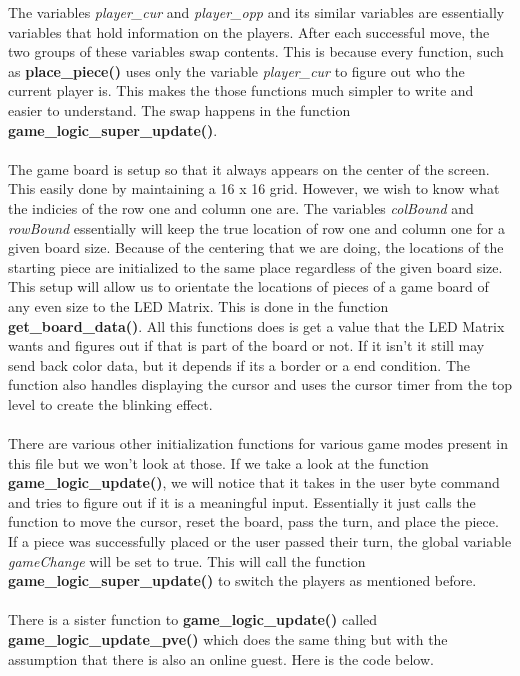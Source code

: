 \documentclass[a4paper, 12pt]{article}
\begin{document}
    The variables \textit{player\_cur} and \textit{player\_opp} and its similar
    variables are essentially variables that hold information on the players.
    After each successful move, the two groups of these variables swap contents.
    This is because every function, such as \textbf{place\_piece()} uses only
    the variable \textit{player\_cur} to figure out who the current player is.
    This makes the those functions much simpler to write and easier to understand.
    The swap happens in the function \textbf{game\_logic\_super\_update()}.
    \\ \\
    The game board is setup so that it always appears on the center of the screen.
    This easily done by maintaining a 16 x 16 grid. However, we wish to know
    what the indicies of the row one and column one are. The variables
    \textit{colBound} and \textit{rowBound} essentially will keep the true
    location of row one and column one for a given board size. Because of the
    centering that we are doing, the locations of the starting piece are 
    initialized to the same place regardless of the given board size.
    This setup will allow us to orientate the locations of pieces of a game 
    board of any even size to the LED Matrix. This is done in the function 
    \textbf{get\_board\_data()}. All this functions does is get a value that
    the LED Matrix wants and figures out if that is part of the board or not.
    If it isn't it still may send back color data, but it depends if its a
    border or a end condition. The function also handles displaying the
    cursor and uses the cursor timer from the top level to create the
    blinking effect.
    \\ \\
    There are various other initialization functions for various game modes
    present in this file but we won't look at those. If we take a look at
    the function \textbf{game\_logic\_update()}, we will notice that it takes
    in the user byte command and tries to figure out if it is a meaningful
    input. Essentially it just calls the function to move the cursor, reset
    the board, pass the turn, and place the piece. If a piece was successfully
    placed or the user passed their turn, the global variable \textit{gameChange}
    will be set to true. This will call the function 
    \textbf{game\_logic\_super\_update()} to switch the players as mentioned
    before.
    \\ \\
    There is a sister function to \textbf{game\_logic\_update()} called
    \textbf{game\_logic\_update\_pve()} which does the same thing but with
    the assumption that there is also an online guest. Here is the code below.
\end{document}
